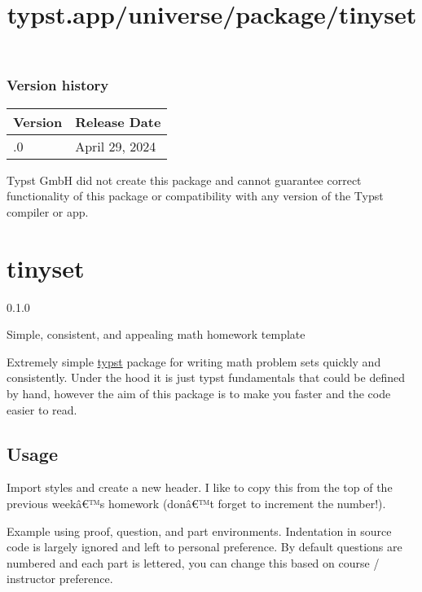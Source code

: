 \label{versions}
\subsubsection{Version history}\label{version-history}

\begin{longtable}[]{@{}ll@{}}
\toprule\noalign{}
Version & Release Date \\
\midrule\noalign{}
\endhead
\bottomrule\noalign{}
\endlastfoot
0.1.0 & April 29, 2024 \\
\end{longtable}

Typst GmbH did not create this package and cannot guarantee correct
functionality of this package or compatibility with any version of the
Typst compiler or app.


\title{typst.app/universe/package/tinyset}

\label{banner}
\section{tinyset}\label{tinyset}

{ 0.1.0 }

Simple, consistent, and appealing math homework template

\label{readme}
Extremely simple \href{https://github.com/typst/typst}{typst} package
for writing math problem sets quickly and consistently. Under the hood
it is just typst fundamentals that could be defined by hand, however the
aim of this package is to make you faster and the code easier to read.

\subsection{Usage}\label{usage}

Import styles and create a new header. I like to copy this from the top
of the previous weekâ€™s homework (donâ€™t forget to increment the
number!).

Example using proof, question, and part environments. Indentation in
source code is largely ignored and left to personal preference. By
default questions are numbered and each part is lettered, you can change
this based on course / instructor preference.

